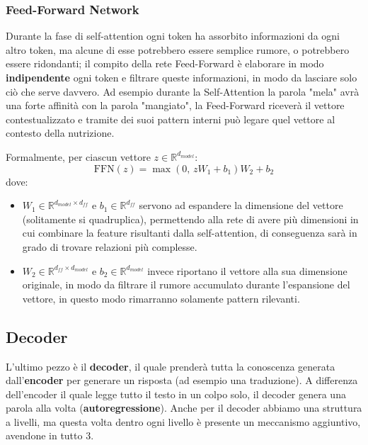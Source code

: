 \documentclass{article}
\begin{document}
\subsubsection{Feed-Forward Network}
\label{sec:ffn}
Durante la fase di self-attention ogni token ha assorbito informazioni da ogni altro token, ma alcune di esse potrebbero essere semplice rumore, o potrebbero essere ridondanti; il compito della rete Feed-Forward è elaborare in modo \textbf{indipendente} ogni token e filtrare queste informazioni, in modo da lasciare solo ciò che serve davvero.
Ad esempio durante la Self-Attention la parola "mela" avrà una forte affinità con la parola "mangiato", la Feed-Forward riceverà il vettore contestualizzato e tramite dei suoi pattern interni può legare quel vettore al contesto della nutrizione.

Formalmente, per ciascun vettore $z \in \mathbb{R}^{d_{model}}$:
$$\text{FFN}(z) = \max(0, \, z W_1 + b_1) W_2 + b_2$$
dove:
\begin{itemize}
    \item $W_1 \in \mathbb{R}^{d_{model} \times d_{ff}}$ e $b_1 \in \mathbb{R}^{d_{ff}}$ servono ad espandere la dimensione del vettore (solitamente si quadruplica), permettendo alla rete di avere più dimensioni in cui combinare la feature risultanti dalla self-attention, di conseguenza sarà in grado di trovare relazioni più complesse.
    \item  $W_2 \in \mathbb{R}^{d_{ff} \times d_{model}}$ e $b_2 \in \mathbb{R}^{d_{model}}$ invece riportano il vettore alla sua dimensione originale, in modo da filtrare il rumore accumulato durante l'espansione del vettore, in questo modo rimarranno solamente pattern rilevanti.
\end{itemize}
\subsection{Decoder}

L'ultimo pezzo è il \textbf{decoder}, il quale prenderà tutta la conoscenza generata dall'\textbf{encoder} per generare un risposta (ad esempio una traduzione).
A differenza dell'encoder il quale legge tutto il testo in un colpo solo, il decoder genera una parola alla volta (\textbf{autoregressione}). Anche per il decoder abbiamo una struttura a livelli, ma questa volta dentro ogni livello è presente un meccanismo aggiuntivo, avendone in tutto 3.
\end{document}

